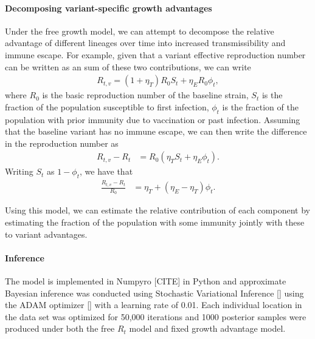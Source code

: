 \documentclass[11pt,oneside,letterpaper]{article}
\begin{document}
\paragraph{Decomposing variant-specific growth advantages}%

Under the free growth model, we can attempt to decompose the relative advantage of different lineages over time into increased transmissibility and immune escape. For example, given that a variant effective reproduction number can be written as an sum of these two contributions, we can write
\begin{align*}
  R_{t,v} = (1+\eta_{T}) R_{0} S_{t} + \eta_{E} R_{0} \phi_{t},
\end{align*}
where $R_{0}$ is the basic reproduction number of the baseline strain, $S_{t}$ is the fraction of the population susceptible to first infection, $\phi_{t}$ is the fraction of the population with prior immunity due to vaccination or past infection. Assuming that the baseline variant has no immune escape, we can then write the difference in the reproduction number as
\begin{align*}
  R_{t,v} - R_{t} &= R_{0} (\eta_{T} S_{t} + \eta_{E} \phi_{t}).
\end{align*}
Writing $S_{t}$ as $1 - \phi_{t}$, we have that
\begin{align*}
  \frac{R_{t,v}-R_{t}}{R_{0}} &= \eta_{T} + (\eta_{E} - \eta_{T})\phi_{t}. 
\end{align*}

Using this model, we can estimate the relative contribution of each component by estimating the fraction of the population with some immunity jointly with these to variant advantages.




\paragraph{Inference}

The model is implemented in Numpyro [CITE] in Python and approximate Bayesian inference was conducted using Stochastic Variational Inference [] using the ADAM optimizer [] with a learning rate of 0.01. 
Each individual location in the data set was optimized for 50,000 iterations and 1000 posterior samples were produced under both the free $R_{t}$ model and fixed growth advantage model.
\end{document}
